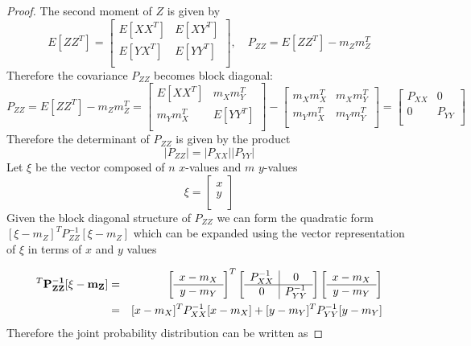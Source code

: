 \begin{proof}
The second moment of $Z$ is given by 
$$E[ZZ^T] 
= \left[\begin{array}{c|c}
E[XX^T] & E[XY^T] \\  
\hline
E[YX^T] & E[YY^T]\\
\end{array}\right], \quad P_{ZZ} = E[ZZ^T] -m_Zm_Z^T  $$
Therefore the covariance $P_{ZZ}$ becomes block diagonal:
$$P_{ZZ} = E[ZZ^T] - m_Zm_Z^T 
= \left[\begin{array}{c|c}
E[XX^T] & m_Xm_Y^T \\  
\hline
m_Ym_X^T & E[YY^T]\\
\end{array}\right] 
- \left[\begin{array}{c|c}
m_Xm_X^T & m_Xm_Y^T \\  
\hline
m_Ym_X^T & m_Ym_Y^T\\
\end{array}\right] 
= \left[\begin{array}{c|c}
P_{XX} & 0 \\  
\hline
0 & P_{YY}\\
\end{array}\right] 
 $$
 Therefore the determinant of $P_{ZZ}$ is given by the product
 $$|P_{ZZ}| = |P_{XX}| |P_{YY}|$$
Let $\xi$ be the vector composed of $n$ $x$-values and $m$ $y$-values 
$$\xi
= \left[\begin{array}{c}
x \\
\hline
y \\
\end{array}\right]$$
Given the block diagonal structure of $P_{ZZ}$ we can form the quadratic form 
$[\xi - m_Z]^T P_{ZZ}^{-1} [\xi - m_Z]$ which can be expanded using the vector representation of $\xi$ in terms of $x$ and $y$ values

\begin{eqnarray*}
[{\bf \xi} - {\bf m_Z}]^T {\bf P^{-1}_{ZZ}}[{\bf \xi} - {\bf m_Z}]  &=& 
\left[\begin{array}{c}
x - m_X \\
\hline
y-m_Y \\
\end{array}\right]^T
\left[\begin{array}{c|c}
P_{XX}^{-1} & 0 \\  
\hline
0 & P_{YY}^{-1}\\
\end{array}\right] 
\left[\begin{array}{c}
x - m_X \\
\hline
y-m_Y \\
\end{array}\right]\\ 
&=&
[x - m_X]^T P_{XX}^{-1} [x - m_X] + [y-m_Y]^TP_{YY}^{-1}[y-m_Y]
\end{eqnarray*}
Therefore the joint probability distribution can be written as 


\end{proof}
